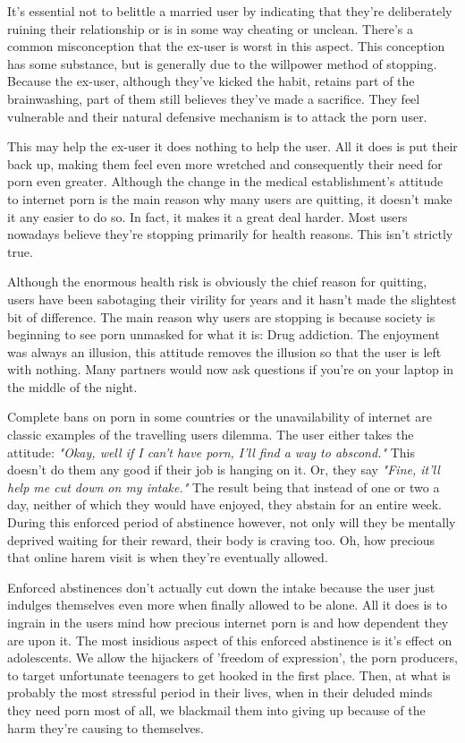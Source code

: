 \documentclass[easypeasy.tex]{subfiles}
\begin{document}
It's essential not to belittle a married user by indicating that they're deliberately ruining their relationship or is in some way cheating or unclean. There's a common misconception that the ex-user is worst in this aspect. This conception has some substance, but is generally due to the willpower method of stopping. Because the ex-user, although they've kicked the habit, retains part of the brainwashing, part of them still believes they've made a sacrifice. They feel vulnerable and their natural defensive mechanism is to attack the porn user.

This may help the ex-user it does nothing to help the user. All it does is put their back up, making them feel even more wretched and consequently their need for porn even greater. Although the change in the medical establishment's attitude to internet porn is the main reason why many users are quitting, it doesn't make it any easier to do so. In fact, it makes it a great deal harder. Most users nowadays believe they're stopping primarily for health reasons. This isn't strictly true.

Although the enormous health risk is obviously the chief reason for quitting, users have been sabotaging their virility for years and it hasn't made the slightest bit of difference. The main reason why users are stopping is because society is beginning to see porn unmasked for what it is: Drug addiction. The enjoyment was always an illusion, this attitude removes the illusion so that the user is left with nothing. Many partners would now ask questions if you're on your laptop in the middle of the night.

Complete bans on porn in some countries or the unavailability of internet are classic examples of the travelling users dilemma. The user either takes the attitude: \textit{"Okay, well if I can't have porn, I'll find a way to abscond."} This doesn't do them any good if their job is hanging on it. Or, they say \textit{"Fine, it'll help me cut down on my intake."} The result being that instead of one or two a day, neither of which they would have enjoyed, they abstain for an entire week. During this enforced period of abstinence however, not only will they be mentally deprived waiting for their reward, their body is craving too. Oh, how precious that online harem visit is when they're eventually allowed.

Enforced abstinences don't actually cut down the intake because the user just indulges themselves even more when finally allowed to be alone. All it does is to ingrain in the users mind how precious internet porn is and how dependent they are upon it. The most insidious aspect of this enforced abstinence is it's effect on adolescents. We allow the hijackers of 'freedom of expression', the porn producers, to target unfortunate teenagers to get hooked in the first place. Then, at what is probably the most stressful period in their lives, when in their deluded minds they need porn most of all, we blackmail them into giving up because of the harm they're causing to themselves.
\end{document}
